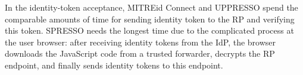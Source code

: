 In the identity-token acceptance,
 MITREid Connect and UPPRESSO spend the comparable amounts of time for sending identity token to the RP and verifying this token.
SPRESSO needs the longest time due to the complicated process at the user browser:
        after receiving identity tokens from the IdP,
        the browser downloads the JavaScript code from a trusted forwarder,
            decrypts the RP endpoint, and finally sends identity tokens to this endpoint.



